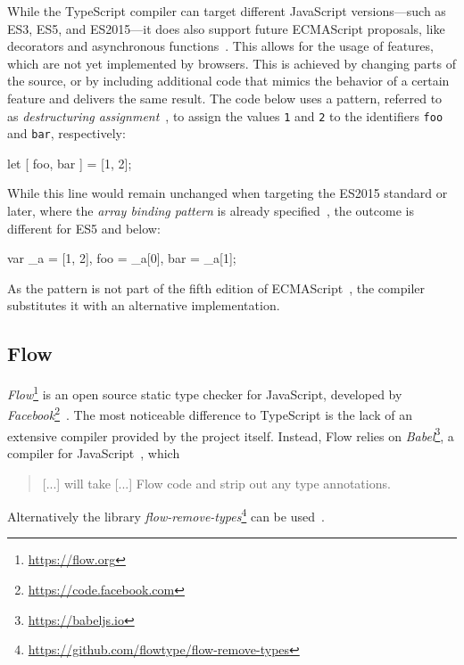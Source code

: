 While the TypeScript compiler can target different JavaScript versions---such as ES3, ES5, and ES2015---it does also support future ECMAScript proposals, like decorators and asynchronous functions~\cites{TypeScriptHandbook:CompilerOptions, TypeScriptWebsite}. This allows for the usage of features, which are not yet implemented by browsers. This is achieved by changing parts of the source, or by including additional code that mimics the behavior of a certain feature and delivers the same result. The code below uses a pattern, referred to as \emph{destructuring assignment}~\cite{DestructuringAssignment:Mozilla:2015}, to assign the values \texttt{1} and \texttt{2} to the identifiers \texttt{foo} and \texttt{bar}, respectively:
\begin{JsCode}[numbers=none]
let [ foo, bar ] = [1, 2];  
\end{JsCode}
While this line would remain unchanged when targeting the ES2015 standard or later, where the \emph{array binding pattern} is already specified~\cite[p.~198]{ES6Spec:Ecma:2015}, the outcome is different for ES5 and below:
\begin{JsCode}[numbers=none]
var _a = [1, 2], foo = _a[0], bar = _a[1];
\end{JsCode}
As the pattern is not part of the fifth edition of ECMAScript~\cite{ES5Spec:Ecma:2015}, the compiler substitutes it with an alternative implementation.
 
\subsection{Flow}
\label{sec:flow}

\emph{Flow}\footnote{\url{https://flow.org}} is an open source static type checker for JavaScript, developed by \emph{Facebook}\footnote{\url{https://code.facebook.com}}~\cite{FacebookCode:Flow}. The most noticeable difference to TypeScript is the lack of an extensive compiler provided by the project itself. Instead, Flow relies on \emph{Babel}\footnote{\url{https://babeljs.io}}, a compiler for JavaScript~\cite{BabelWebsite}, which
\begin{quote}
  [...] will take [...] Flow code and strip out any type annotations.~\cite{FlowDocs:Install}
\end{quote}
Alternatively the library \emph{flow-remove-types}\footnote{\url{https://github.com/flowtype/flow-remove-types}} can be used~\cite{FlowDocs:Install}.

